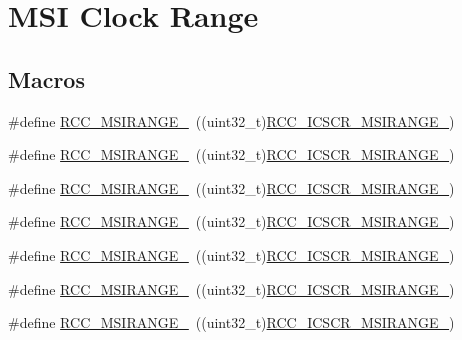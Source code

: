 \hypertarget{group___r_c_c___m_s_i___clock___range}{\section{M\-S\-I Clock Range}
\label{group___r_c_c___m_s_i___clock___range}
}
\subsection*{Macros}
\begin{DoxyCompactItemize}
\item 
\#define \hyperlink{group___r_c_c___m_s_i___clock___range_ga3a266a56e6a43bdaef4bbcc1eee4c360}{R\-C\-C\-\_\-\-M\-S\-I\-R\-A\-N\-G\-E\-\_}~((uint32\-\_\-t)\hyperlink{group___peripheral___registers___bits___definition_ga9ec7422168fd486c1a0031116f9acd93}{R\-C\-C\-\_\-\-I\-C\-S\-C\-R\-\_\-\-M\-S\-I\-R\-A\-N\-G\-E\-\_})
\item 
\#define \hyperlink{group___r_c_c___m_s_i___clock___range_ga90601d6a9beb6a00245ecbf193d0ece5}{R\-C\-C\-\_\-\-M\-S\-I\-R\-A\-N\-G\-E\-\_}~((uint32\-\_\-t)\hyperlink{group___peripheral___registers___bits___definition_ga9c51e3867e3fe6f4c2429408fbbe78a8}{R\-C\-C\-\_\-\-I\-C\-S\-C\-R\-\_\-\-M\-S\-I\-R\-A\-N\-G\-E\-\_})
\item 
\#define \hyperlink{group___r_c_c___m_s_i___clock___range_gafa12a5d5063914b4aa66c8f12324926e}{R\-C\-C\-\_\-\-M\-S\-I\-R\-A\-N\-G\-E\-\_}~((uint32\-\_\-t)\hyperlink{group___peripheral___registers___bits___definition_ga48527b1ba8d8f88073a34f5af4c7557d}{R\-C\-C\-\_\-\-I\-C\-S\-C\-R\-\_\-\-M\-S\-I\-R\-A\-N\-G\-E\-\_})
\item 
\#define \hyperlink{group___r_c_c___m_s_i___clock___range_ga2eb0f8e9e5800747454d52f5497dea57}{R\-C\-C\-\_\-\-M\-S\-I\-R\-A\-N\-G\-E\-\_}~((uint32\-\_\-t)\hyperlink{group___peripheral___registers___bits___definition_ga4bc6acbe6b593a22910be5202ea8f920}{R\-C\-C\-\_\-\-I\-C\-S\-C\-R\-\_\-\-M\-S\-I\-R\-A\-N\-G\-E\-\_})
\item 
\#define \hyperlink{group___r_c_c___m_s_i___clock___range_gab5ca16a71f018ae2ceb5bcef29434f1c}{R\-C\-C\-\_\-\-M\-S\-I\-R\-A\-N\-G\-E\-\_}~((uint32\-\_\-t)\hyperlink{group___peripheral___registers___bits___definition_ga59e25d967d4cc17665fb9e49b6f75dd7}{R\-C\-C\-\_\-\-I\-C\-S\-C\-R\-\_\-\-M\-S\-I\-R\-A\-N\-G\-E\-\_})
\item 
\#define \hyperlink{group___r_c_c___m_s_i___clock___range_gabcd068b50d4fdfb3529272fbb169ebb1}{R\-C\-C\-\_\-\-M\-S\-I\-R\-A\-N\-G\-E\-\_}~((uint32\-\_\-t)\hyperlink{group___peripheral___registers___bits___definition_ga30480b94b74b9f8264617059baa16786}{R\-C\-C\-\_\-\-I\-C\-S\-C\-R\-\_\-\-M\-S\-I\-R\-A\-N\-G\-E\-\_})
\item 
\#define \hyperlink{group___r_c_c___m_s_i___clock___range_ga7f6e3de13b041244869fba14585c43fe}{R\-C\-C\-\_\-\-M\-S\-I\-R\-A\-N\-G\-E\-\_}~((uint32\-\_\-t)\hyperlink{group___peripheral___registers___bits___definition_gaa2179594652f94a2b51e13559612e5ea}{R\-C\-C\-\_\-\-I\-C\-S\-C\-R\-\_\-\-M\-S\-I\-R\-A\-N\-G\-E\-\_})
\end{DoxyCompactItemize}



